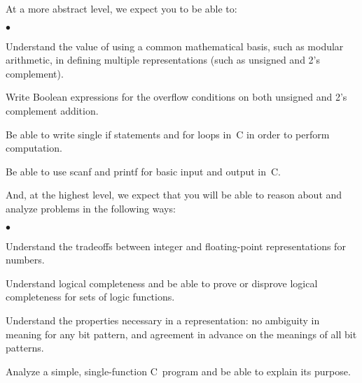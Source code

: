 At a more abstract level, we expect you to be able to:

\begin{list}{$\bullet$}{\setlength{\itemsep}{0pt}\setlength{\parskip}{0pt}%
\setlength{\topsep}{0pt}\setlength{\partopsep}{0pt}\setlength{\parsep}{0pt}}

\item{Understand the value of using a common mathematical basis, such
as modular arithmetic, in defining multiple representations (such as
unsigned and 2's complement).}

\item{Write Boolean expressions for the overflow conditions
on both unsigned and 2's complement addition.}

%

\item{Be able to write single {\tfix if} statements and {\tfix for} loops
in~C in order to perform computation.}

\item{Be able to use {\tfix scanf} and {\tfix printf} for basic input and 
output in~C.}

\end{list}

And, at the highest level, we expect that you will be able to reason about
and analyze problems in the following ways:

\begin{list}{$\bullet$}{\setlength{\itemsep}{0pt}\setlength{\parskip}{0pt}%
\setlength{\topsep}{0pt}\setlength{\partopsep}{0pt}\setlength{\parsep}{0pt}}

\item{Understand the tradeoffs between integer
and floating-point representations for numbers.}

\item{Understand logical completeness and be able to prove or disprove
logical completeness for sets of logic functions.}

%
\item{Understand the properties necessary in a representation: no ambiguity
in meaning for any bit pattern, and agreement in advance on the meanings of 
all bit patterns.}

\item{Analyze a simple, single-function C~program and be able to explain its purpose.}

\end{list}

